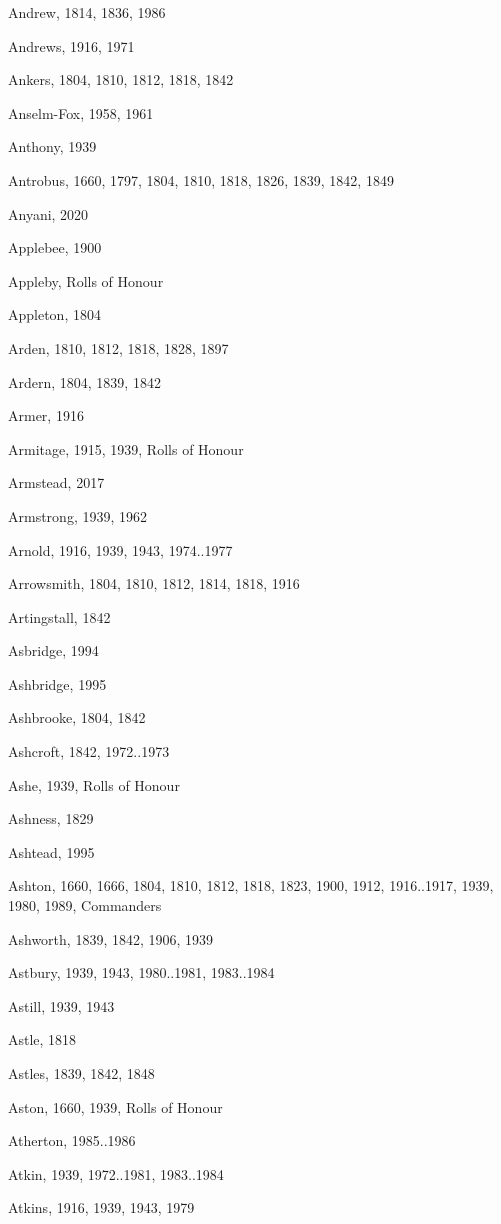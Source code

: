 \begin{theindex}
\item Andrew, 1814, 1836, 1986
\item Andrews, 1916, 1971
\item Ankers, 1804, 1810, 1812, 1818, 1842
\item Anselm-Fox, 1958, 1961
\item Anthony, 1939
\item Antrobus, 1660, 1797, 1804, 1810, 1818, 1826, 1839, 1842, 1849
\item Anyani, 2020
\item Applebee, 1900
\item Appleby, Rolls of Honour
\item Appleton, 1804
\item Arden, 1810, 1812, 1818, 1828, 1897
\item Ardern, 1804, 1839, 1842
\item Armer, 1916
\item Armitage, 1915, 1939, Rolls of Honour
\item Armstead, 2017
\item Armstrong, 1939, 1962
\item Arnold, 1916, 1939, 1943, 1974..1977
\item Arrowsmith, 1804, 1810, 1812, 1814, 1818, 1916
\item Artingstall, 1842
\item Asbridge, 1994
\item Ashbridge, 1995
\item Ashbrooke, 1804, 1842
\item Ashcroft, 1842, 1972..1973
\item Ashe, 1939, Rolls of Honour
\item Ashness, 1829
\item Ashtead, 1995
\item Ashton, 1660, 1666, 1804, 1810, 1812, 1818, 1823, 1900, 1912, 1916..1917, 1939, 1980, 1989, Commanders
\item Ashworth, 1839, 1842, 1906, 1939
\item Astbury, 1939, 1943, 1980..1981, 1983..1984
\item Astill, 1939, 1943
\item Astle, 1818
\item Astles, 1839, 1842, 1848
\item Aston, 1660, 1939, Rolls of Honour
\item Atherton, 1985..1986
\item Atkin, 1939, 1972..1981, 1983..1984
\item Atkins, 1916, 1939, 1943, 1979

\end{theindex}
